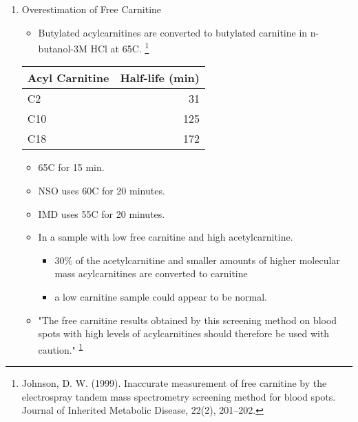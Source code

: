 \documentclass{scrartcl}
\begin{document}
\begin{enumerate}
\item Overestimation of Free Carnitine
\label{sec:orgbb02005}

\begin{itemize}
\item Butylated acylcarnitines are converted to butylated carnitine in
n-butanol-3M HCl at 65\degree{}C. \footnote{Johnson, D. W. (1999). Inaccurate measurement of free
carnitine by the electrospray tandem mass spectrometry screening
method for blood spots. Journal of Inherited Metabolic Disease, 22(2),
201–202.\label{org9b21f28}}
\end{itemize}

\begin{center}
\begin{tabular}{lr}
Acyl Carnitine & Half-life (min)\\
\hline
C2 & 31\\
C10 & 125\\
C18 & 172\\
\end{tabular}
\end{center}

\begin{itemize}
\item 65\degree{}C for 15 min.
\item NSO uses 60\degree{}C for 20 minutes.
\item IMD uses 55\degree{}C for 20 minutes.

\item In a sample with low free carnitine and high acetylcarnitine.
\begin{itemize}
\item 30\% of the acetylcarnitine and smaller amounts of higher
molecular mass acylcarnitines are converted to carnitine
\item a low carnitine sample could appear to be normal.
\end{itemize}
\item "The free carnitine results obtained by this screening method on
blood spots with high levels of acylcarnitines should therefore be
used with caution." \textsuperscript{\ref{org9b21f28}}
\end{itemize}


\end{enumerate}
\end{document}
